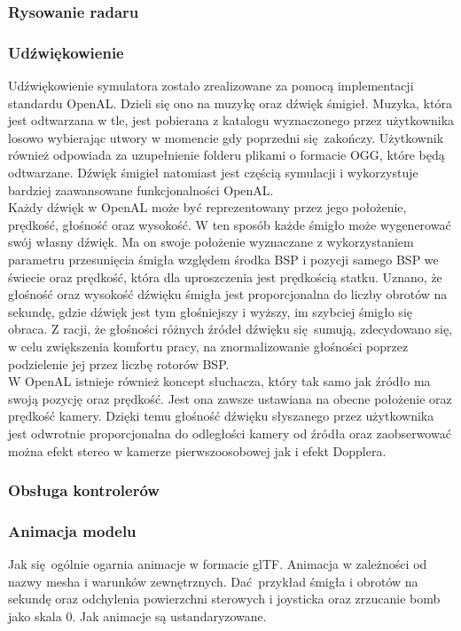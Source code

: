\subsubsection{Rysowanie radaru}
\subsubsection{Udźwiękowienie}

Udźwiękowienie symulatora zostało zrealizowane za pomocą implementacji standardu OpenAL. Dzieli się ono na muzykę oraz dźwięk śmigieł. Muzyka, która jest odtwarzana w tle, jest pobierana z katalogu wyznaczonego przez użytkownika losowo wybierając utwory w momencie gdy poprzedni się zakończy. Użytkownik również odpowiada za uzupełnienie folderu plikami o formacie OGG, które będą odtwarzane. Dźwięk śmigieł natomiast jest częścią symulacji i wykorzystuje bardziej zaawansowane funkcjonalności OpenAL. 
\\

Każdy dźwięk w OpenAL może być reprezentowany przez jego położenie, prędkość, głośność oraz wysokość. W ten sposób każde śmigło może wygenerować swój własny dźwięk. Ma on swoje położenie wyznaczane z wykorzystaniem parametru przesunięcia śmigła względem środka BSP i pozycji samego BSP we świecie oraz prędkość, która dla uproszczenia jest prędkością statku. Uznano, że głośność oraz wysokość dźwięku śmigła jest proporcjonalna do liczby obrotów na sekundę, gdzie dźwięk jest tym głośniejszy i wyższy, im szybciej śmigło się obraca. Z racji, że głośności różnych źródeł dźwięku się sumują, zdecydowano się, w celu zwiększenia komfortu pracy, na znormalizowanie głośności poprzez podzielenie jej przez liczbę rotorów BSP. 
\\

W OpenAL istnieje również koncept słuchacza, który tak samo jak źródło ma swoją pozycję oraz prędkość. Jest ona zawsze ustawiana na obecne położenie oraz prędkość kamery. Dzięki temu głośność dźwięku słyszanego przez użytkownika jest odwrotnie proporcjonalna do odległości kamery od źródła oraz zaobserwować można efekt stereo w kamerze pierwszoosobowej jak i efekt Dopplera.
\\

\subsubsection{Obsługa kontrolerów}

\subsubsection{Animacja modelu}


\color{red}
Jak się ogólnie ogarnia animacje w formacie glTF. Animacja w zależności od nazwy mesha i warunków zewnętrznych. Dać przykład śmigła i obrotów na sekundę oraz odchylenia powierzchni sterowych i joysticka oraz zrzucanie bomb jako skala 0. Jak animacje są ustandaryzowane.
\color{black}